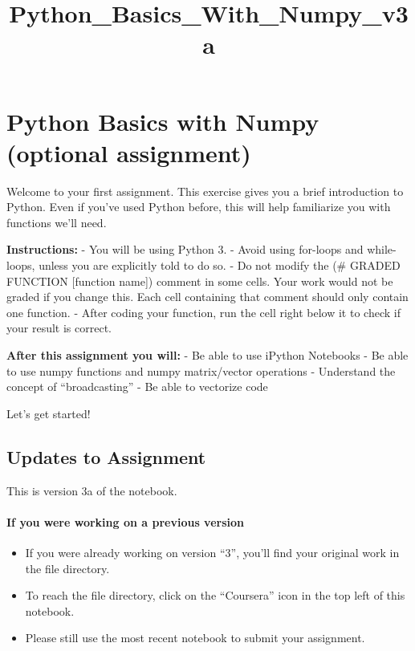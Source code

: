 \documentclass[11pt]{article}
\title{Python\_Basics\_With\_Numpy\_v3a}
\begin{document}
    
    
    \maketitle
    
    

    
    \section{Python Basics with Numpy (optional
assignment)}\label{python-basics-with-numpy-optional-assignment}

Welcome to your first assignment. This exercise gives you a brief
introduction to Python. Even if you've used Python before, this will
help familiarize you with functions we'll need.

\textbf{Instructions:} - You will be using Python 3. - Avoid using
for-loops and while-loops, unless you are explicitly told to do so. - Do
not modify the (\# GRADED FUNCTION {[}function name{]}) comment in some
cells. Your work would not be graded if you change this. Each cell
containing that comment should only contain one function. - After coding
your function, run the cell right below it to check if your result is
correct.

\textbf{After this assignment you will:} - Be able to use iPython
Notebooks - Be able to use numpy functions and numpy matrix/vector
operations - Understand the concept of ``broadcasting'' - Be able to
vectorize code

Let's get started!

    \subsection{ Updates to Assignment}\label{updates-to-assignment}

This is version 3a of the notebook.

\paragraph{If you were working on a previous
version}\label{if-you-were-working-on-a-previous-version}

\begin{itemize}
\itemsep1pt\parskip0pt
\item
  If you were already working on version ``3'', you'll find your
  original work in the file directory.\\
\item
  To reach the file directory, click on the ``Coursera'' icon in the top
  left of this notebook.
\item
  Please still use the most recent notebook to submit your assignment.
\end{itemize}
\end{document}
